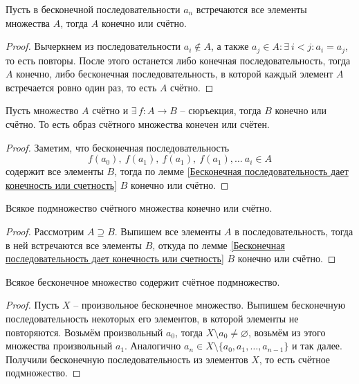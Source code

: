 \documentclass[12pt]{article}
\begin{document}
\begin{lemma}\label{Бесконечная
	последовательность дает конечность или счетность}
	Пусть в бесконечной последовательности $a_n$ встречаются все
	элементы множества $A$, тогда $A$ конечно или счётно.
	\begin{proof}
		Вычеркнем из последовательности $a_i\notin A$, а также $a_j\in
		A\colon \exists\ i<j\colon a_i=a_j$, то есть повторы. После этого
		останется либо конечная последовательность, тогда $A$ конечно, либо
		бесконечная последовательность, в которой каждый элемент $A$
		встречается ровно один раз, то есть $A$ счётно.
	\end{proof}
\end{lemma}
\begin{consequence}\label{Сюръекция на счётном дает счётность}
	Пусть множество $A$ счётно и $\exists\,f\colon A\to B$ -- сюръекция,
	тогда $B$ конечно или счётно. То есть образ счётного множества
	конечен или счётен.
	\begin{proof}
		Заметим, что бесконечная последовательность
		\[f(a_0),\ f(a_1),\ f(a_1),\ f(a_1),\ldots\ a_i\in A\]		содержит
		все элементы $B$, тогда по лемме \ref{Бесконечная
		последовательность дает конечность или счетность} $B$ конечно или счётно.
	\end{proof}
\end{consequence}
\begin{lemma}\label{Всякое подмножество счётного множества конечно или счётно}
	Всякое подмножество счётного множества конечно или счётно.
	\begin{proof}
		Рассмотрим $A\supseteq B$. Выпишем все элементы $A$ в
		последовательность, тогда в ней встречаются все элементы $B$,
		откуда по лемме \ref{Бесконечная
		последовательность дает конечность или счетность} $B$ конечно или счётно.
	\end{proof}
\end{lemma}
\begin{lemma}\label{Всякое бесконечное множество содержит счётное подмножество}
	Всякое бесконечное множество содержит счётное подмножество.
	\begin{proof}
		Пусть $X$ -- произвольное бесконечное множество. Выпишем
		бесконечную последовательность некоторых его элементов, в которой
		элементы не повторяются. Возьмём произвольный $a_0$, тогда
		$X\setminus a_0\neq\varnothing$, возьмём из этого множества
		произвольный $a_1$. Аналогично $a_n\in
		X\setminus\{a_0,a_1,\ldots,a_{n-1}\}$ и так далее. Получили
		бесконечную последовательность из элементов $X$, то есть счётное подмножество.
	\end{proof}
\end{lemma}
\end{document}
